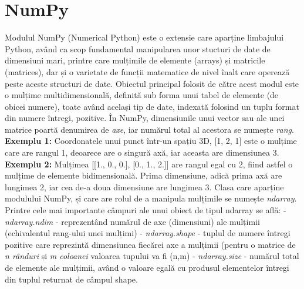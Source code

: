 \documentclass[a4paper,12pt]{report}
\newcommand\tab[1][1cm]{\hspace*{#1}}
\begin{document}
\section {NumPy}
\tab Modulul NumPy (Numerical Python) este o extensie care aparține limbajului Python, având ca scop fundamental manipularea unor stucturi de date de dimensiuni 
mari, printre care mulțimile de elemente (arrays) și matricile (matrices), dar și o varietate de funcții matematice de nivel înalt care operează peste aceste structuri de date. Obiectul principal folosit
de către acest modul este o mulțime multidimensională, definită sub forma unui tabel de elemente (de obicei numere), toate având același tip de date, indexată 
folosind un tuplu format din numere întregi, pozitive. În NumPy, dimensiunile unui vector sau ale unei matrice poartă denumirea de \textit{axe}, iar numărul total al acestora
se numește \textit{rang}.
\newline\tab\textbf{ Exemplu 1:} Coordonatele unui punct într-un spațiu 3D, [1, 2, 1] este o mulțime care are rangul 1, deoarece are o singură axă, iar aceasta are dimensiunea 3. 
\newline\tab\textbf{ Exemplu 2:} Mulțimea [[1., 0., 0.], [0., 1., 2.]] are rangul egal cu 2, fiind astfel o mulțime de elemente bidimensională. Prima dimensiune, adică prima axă are lungimea 2,
iar cea de-a doua dimensiune are lungimea 3.
\newline
\newline\tab Clasa care aparține modulului NumPy, și care are rolul de a manipula mulțimile se numește \textit{ndarray}. Printre cele mai importante câmpuri ale unui obiect de tipul ndarray se află:
\newline - \textit{ndarray.ndim} - reprezentând numărul de axe (dimensiuni) ale mulțimii (echivalentul rang-ului unei mulțimi)
\newline - \textit{ndarray.shape} - tuplul de numere întregi pozitive care reprezintă
dimensiunea fiecărei axe a mulțimii (pentru o matrice de \textit {n rânduri} și \textit {m coloanei} valoarea tupului va fi (n,m)
\newline - \textit {ndarray.size} - numărul total de elemente ale mulțimii, având o valoare egală cu produsul elementelor întregi din tuplul returnat de câmpul shape.
\end{document}
